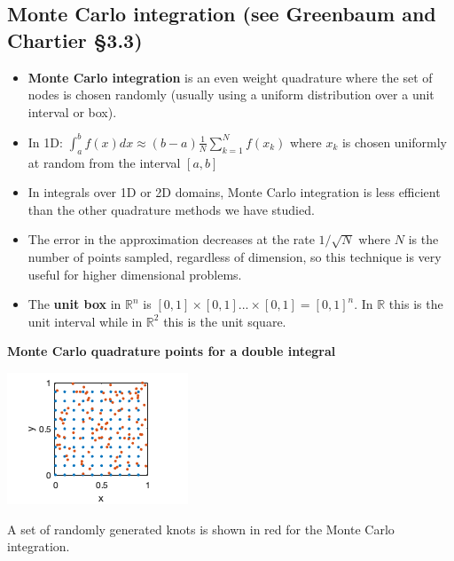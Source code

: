 \documentclass[12pt,letterpaper,noanswers]{exam}
\begin{document}
\subsection*{Monte Carlo integration (see Greenbaum and Chartier \S 3.3)}
\begin{tcolorbox}
\begin{itemize}
\itemsep0em
    \item \textbf{Monte Carlo integration} is an even weight quadrature where the set of nodes is chosen randomly (usually using a uniform distribution over a unit interval or box).
    \item In 1D: $\displaystyle\int_a^b f(x) dx \approx (b-a)\frac{1}{N}\sum\limits_{k=1}^Nf(x_k)$ where $x_k$ is chosen uniformly at random from the interval $[a,b]$
     \item In integrals over 1D or 2D domains, Monte Carlo integration is less efficient than the other quadrature methods we have studied.
      \item The error in the approximation decreases at the rate $1/\sqrt{N}$ where $N$ is the number of points sampled, regardless of dimension, so this technique is very useful for higher dimensional problems.
      \item The \textbf{unit box} in $\mathbb{R}^n$ is $[0,1]\times [0,1] ...\times [0,1] = [0,1]^n$.  In $\mathbb{R}$ this is the unit interval while in $\mathbb{R}^2$ this is the unit square.
    \end{itemize}
    \end{tcolorbox}


\noindent\textbf{Monte Carlo quadrature points for a double integral}


\begin{multicols}{2}
\includegraphics{img/C15domain.png}

A set of randomly generated knots is shown in red for the Monte Carlo integration.  
\end{multicols}
\end{document}
